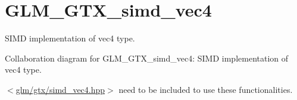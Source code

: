 \hypertarget{group__gtx__simd__vec4}{}\section{G\+L\+M\+\_\+\+G\+T\+X\+\_\+simd\+\_\+vec4}
\label{group__gtx__simd__vec4}


S\+I\+M\+D implementation of vec4 type.  


Collaboration diagram for G\+L\+M\+\_\+\+G\+T\+X\+\_\+simd\+\_\+vec4\+:
S\+I\+M\+D implementation of vec4 type. 

$<$\hyperlink{simd__vec4_8hpp}{glm/gtx/simd\+\_\+vec4.\+hpp}$>$ need to be included to use these functionalities. 